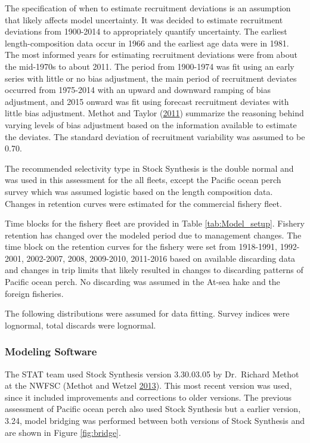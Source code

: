 \documentclass[12pt,]{article}
\begin{document}
The specification of when to estimate recruitment deviations is an
assumption that likely affects model uncertainty. It was decided to
estimate recruitment deviations from 1900-2014 to appropriately quantify
uncertainty. The earliest length-composition data occur in 1966 and the
earliest age data were in 1981. The most informed years for estimating
recruitment deviations were from about the mid-1970s to about 2011. The
period from 1900-1974 was fit using an early series with little or no
bias adjustment, the main period of recruitment deviates occurred from
1975-2014 with an upward and downward ramping of bias adjustment, and
2015 onward was fit using forecast recruitment deviates with little bias
adjustment. Methot and Taylor
(\protect\hyperlink{ref-methot_adjusting_2011}{2011}) summarize the
reasoning behind varying levels of bias adjustment based on the
information available to estimate the deviates. The standard deviation
of recruitment variability was assumed to be 0.70.

The recommended selectivity type in Stock Synthesis is the double normal
and was used in this assessment for the all fleets, except the Pacific
ocean perch survey which was assumed logistic based on the length
composition data. Changes in retention curves were estimated for the
commercial fishery fleet.

Time blocks for the fishery fleet are provided in Table
\ref{tab:Model_setup}. Fishery retention has changed over the modeled
period due to management changes. The time block on the retention curves
for the fishery were set from 1918-1991, 1992-2001, 2002-2007, 2008,
2009-2010, 2011-2016 based on available discarding data and changes in
trip limits that likely resulted in changes to discarding patterns of
Pacific ocean perch. No discarding was assumed in the At-sea hake and
the foreign fisheries.

The following distributions were assumed for data fitting. Survey
indices were lognormal, total discards were lognormal.

\subsubsection{Modeling Software}\label{modeling-software}

The STAT team used Stock Synthesis version 3.30.03.05 by Dr.~Richard
Methot at the NWFSC (Methot and Wetzel
\protect\hyperlink{ref-methot_stock_2013}{2013}). This most recent
version was used, since it included improvements and corrections to
older versions. The previous assessment of Pacific ocean perch also used
Stock Synthesis but a earlier version, 3.24, model bridging was
performed between both versions of Stock Synthesis and are shown in
Figure \ref{fig:bridge}.
\end{document}
